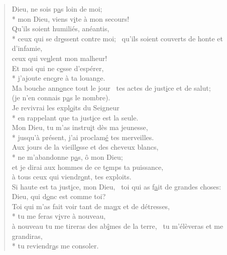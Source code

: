 \begin{verse}
Dieu, ne sois p\underline{a}s loin de moi; \\*
mon Dieu, viens v\underline{i}te à mon secours! \\
Qu’ils soient humiliés, anéantis, \\*
ceux qui se dr\underline{e}ssent contre moi;~\psalmstar
qu’ils soient couverts de honte et d’infamie, \\
ceux qui ve\underline{u}lent mon malheur! \\

Et moi qui ne c\underline{e}sse d’espérer, \\*
j’ajoute enc\underline{o}re à ta louange. \\
Ma bouche ann\underline{o}nce tout le jour~\psalmdagger
tes actes de just\underline{i}ce et de salut; \\
(je n’en connais p\underline{a}s le nombre). \\

Je revivrai les expl\underline{o}its du Seigneur \\*
en rappelant que ta just\underline{i}ce est la seule. \\
Mon Dieu, tu m’as instru\underline{i}t dès ma jeunesse, \\*
jusqu’à présent, j’ai proclam\underline{é} tes merveilles. \\

Aux jours de la vieill\underline{e}sse et des cheveux blancs, \\*
ne m’abandonne p\underline{a}s, ô mon Dieu; \\
et je dirai aux hommes de ce t\underline{e}mps ta puissance, \\
à tous ceux qui viendr\underline{o}nt, tes exploits. \\

Si haute est ta just\underline{i}ce, mon Dieu,~\psalmdagger
toi qui as f\underline{a}it de grandes choses: \\
Dieu, qui d\underline{o}nc est comme toi? \\

Toi qui m’as fait voir tant de ma\underline{u}x et de détresses, \\*
tu me feras v\underline{i}vre à nouveau, \\
à nouveau tu me tireras des ab\underline{î}mes de la terre,~\psalmstar
{}tu m’élèveras et me grandiras, \\*
tu reviendr\underline{a}s me consoler. \\


\end{verse}
